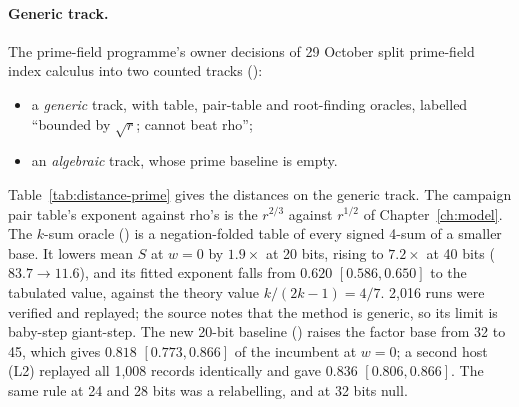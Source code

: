 \paragraph{Generic track.} The prime-field programme's owner decisions of
29 October split prime-field index calculus into two counted tracks
():
\begin{itemize}
\item a \emph{generic} track, with table, pair-table and root-finding
  oracles, labelled ``bounded by $\sqrt r$; cannot beat rho'';
\item an \emph{algebraic} track, whose prime baseline is empty.
\end{itemize}
Table~\ref{tab:distance-prime} gives the distances on the generic track.
The campaign pair table's exponent against rho's is the $r^{2/3}$ against
$r^{1/2}$ of Chapter~\ref{ch:model}. The $k$-sum oracle
() is a negation-folded table of
every signed 4-sum of a smaller base. It lowers mean $S$ at $w=0$ by
$1.9\times$ at 20 bits, rising to $7.2\times$ at 40 bits ($83.7\to11.6$),
and its fitted exponent falls from $0.620$ $[0.586,0.650]$ to the
tabulated value, against the theory value $k/(2k-1)=4/7$. 2{,}016 runs
were verified and replayed; the source notes that the method is generic,
so its limit is baby-step giant-step. The new 20-bit baseline
() raises the factor base
from 32 to 45, which gives $0.818$ $[0.773,0.866]$ of the incumbent at
$w=0$; a second host (L2) replayed all 1{,}008 records identically and gave
$0.836$ $[0.806,0.866]$. The same rule at 24 and 28 bits was a
relabelling, and at 32 bits null.

